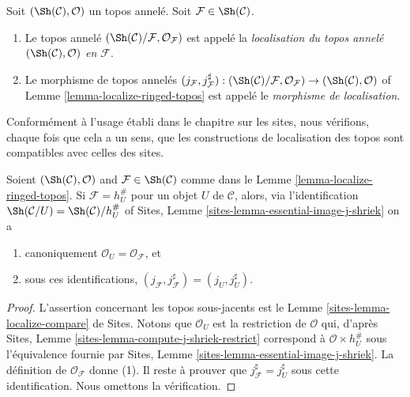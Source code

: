 \begin{definition}
\label{definition-localize-ringed-topos}
Soit $(\Sh(\mathcal{C}), \mathcal{O})$ un topos annelé.
Soit $\mathcal{F} \in \Sh(\mathcal{C})$.
\begin{enumerate}
\item Le topos annelé
$(\Sh(\mathcal{C})/\mathcal{F}, \mathcal{O}_\mathcal{F})$
est appelé la
{\it localisation du topos annelé
$(\Sh(\mathcal{C}), \mathcal{O})$ en $\mathcal{F}$}.
\item Le morphisme de topos annelés
$(j_\mathcal{F}, j_\mathcal{F}^\sharp) :
(\Sh(\mathcal{C})/\mathcal{F}, \mathcal{O}_\mathcal{F})
\to
(\Sh(\mathcal{C}), \mathcal{O})$ of
Lemme \ref{lemma-localize-ringed-topos}
est appelé le {\it morphisme de localisation}.
\end{enumerate}
\end{definition}

\noindent
Conformément à l'usage établi dans le chapitre sur les sites, nous
vérifions, chaque fois que cela a un sens, que les constructions de
localisation des topos sont compatibles avec celles des sites.

\begin{lemma}
\label{lemma-localize-compare}
Soient
$(\Sh(\mathcal{C}), \mathcal{O})$ and
$\mathcal{F} \in \Sh(\mathcal{C})$ comme dans le
Lemme \ref{lemma-localize-ringed-topos}.
Si $\mathcal{F} = h_U^\#$ pour un objet $U$ de $\mathcal{C}$, alors, via
l'identification
$\Sh(\mathcal{C}/U) = \Sh(\mathcal{C})/h_U^\#$ of
Sites, Lemme \ref{sites-lemma-essential-image-j-shriek}
on a
\begin{enumerate}
\item canoniquement $\mathcal{O}_U = \mathcal{O}_\mathcal{F}$, et
\item sous ces identifications,
$(j_\mathcal{F}, j_\mathcal{F}^\sharp) = (j_U, j_U^\sharp)$.
\end{enumerate}
\end{lemma}

\begin{proof}
L'assertion concernant les topos sous-jacents est le
Lemme \ref{sites-lemma-localize-compare} de Sites.
Notons que $\mathcal{O}_U$ est la restriction de $\mathcal{O}$ qui, d'après
Sites, Lemme \ref{sites-lemma-compute-j-shriek-restrict}
correspond à $\mathcal{O} \times h_U^\#$ sous l'équivalence fournie par
Sites, Lemme \ref{sites-lemma-essential-image-j-shriek}.
La définition de $\mathcal{O}_\mathcal{F}$ donne (1).
Il reste à prouver que $j_\mathcal{F}^\sharp = j_U^\sharp$ sous cette
identification. Nous omettons la vérification.
\end{proof}

